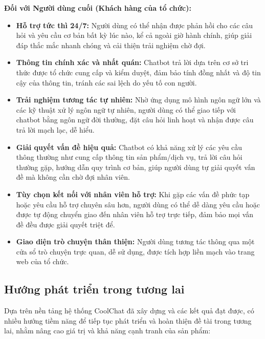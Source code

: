 \textbf{Đối với Người dùng cuối (Khách hàng của tổ chức):}
\begin{itemize}
    \item \textbf{Hỗ trợ tức thì 24/7:} Người dùng có thể nhận được phản hồi cho các câu hỏi và yêu cầu cơ bản bất kỳ lúc nào, kể cả ngoài giờ hành chính, giúp giải đáp thắc mắc nhanh chóng và cải thiện trải nghiệm chờ đợi.
    \item \textbf{Thông tin chính xác và nhất quán:} Chatbot trả lời dựa trên cơ sở tri thức được tổ chức cung cấp và kiểm duyệt, đảm bảo tính đồng nhất và độ tin cậy của thông tin, tránh các sai lệch do yếu tố con người.
    \item \textbf{Trải nghiệm tương tác tự nhiên:} Nhờ ứng dụng mô hình ngôn ngữ lớn và các kỹ thuật xử lý ngôn ngữ tự nhiên, người dùng có thể giao tiếp với chatbot bằng ngôn ngữ đời thường, đặt câu hỏi linh hoạt và nhận được câu trả lời mạch lạc, dễ hiểu.
    \item \textbf{Giải quyết vấn đề hiệu quả:} Chatbot có khả năng xử lý các yêu cầu thông thường như cung cấp thông tin sản phẩm/dịch vụ, trả lời câu hỏi thường gặp, hướng dẫn quy trình cơ bản, giúp người dùng tự giải quyết vấn đề mà không cần chờ đợi nhân viên.
    \item \textbf{Tùy chọn kết nối với nhân viên hỗ trợ:} Khi gặp các vấn đề phức tạp hoặc yêu cầu hỗ trợ chuyên sâu hơn, người dùng có thể dễ dàng yêu cầu hoặc được tự động chuyển giao đến nhân viên hỗ trợ trực tiếp, đảm bảo mọi vấn đề đều được giải quyết triệt để.
    \item \textbf{Giao diện trò chuyện thân thiện:} Người dùng tương tác thông qua một cửa sổ trò chuyện trực quan, dễ sử dụng, được tích hợp liền mạch vào trang web của tổ chức.
\end{itemize}


\subsection{Hướng phát triển trong tương lai}
Dựa trên nền tảng hệ thống CoolChat đã xây dựng và các kết quả đạt được, có nhiều hướng tiềm năng để tiếp tục phát triển và hoàn thiện đề tài trong tương lai, nhằm nâng cao giá trị và khả năng cạnh tranh của sản phẩm:

